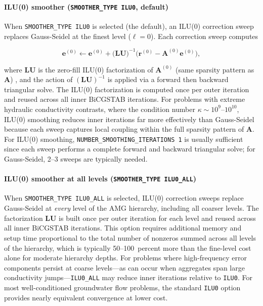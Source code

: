 \paragraph{ILU(0) smoother (\texttt{SMOOTHER\_TYPE ILU0}, default)}
When \texttt{SMOOTHER\_TYPE ILU0} is selected (the default), an ILU(0) correction sweep replaces Gauss-Seidel at the finest level ($\ell = 0$). Each correction sweep computes

\begin{equation}
  \label{eqn:ilu0smooth}
  \mathbf{e}^{(0)} \leftarrow \mathbf{e}^{(0)} + \bigl(\mathbf{L}\mathbf{U}\bigr)^{-1}
    \bigl(\mathbf{r}^{(0)} - \mathbf{A}^{(0)}\mathbf{e}^{(0)}\bigr) ,
\end{equation}

\noindent where $\mathbf{L}\mathbf{U}$ is the zero-fill ILU(0) factorization of $\mathbf{A}^{(0)}$ (same sparsity pattern as $\mathbf{A}$) \citep{saad2003iterative,trottenberg2001}, and the action of $(\mathbf{L}\mathbf{U})^{-1}$ is applied via a forward then backward triangular solve. The ILU(0) factorization is computed once per outer iteration and reused across all inner BiCGSTAB iterations. For problems with extreme hydraulic conductivity contrasts, where the condition number $\kappa \sim 10^9$--$10^{10}$, ILU(0) smoothing reduces inner iterations far more effectively than Gauss-Seidel because each sweep captures local coupling within the full sparsity pattern of $\mathbf{A}$. For ILU(0) smoothing, \texttt{NUMBER\_SMOOTHING\_ITERATIONS 1} is usually sufficient since each sweep performs a complete forward and backward triangular solve; for Gauss-Seidel, 2--3 sweeps are typically needed.

\paragraph{ILU(0) smoother at all levels (\texttt{SMOOTHER\_TYPE ILU0\_ALL})}
When \texttt{SMOOTHER\_TYPE ILU0\_ALL} is selected, ILU(0) correction sweeps replace Gauss-Seidel at \emph{every} level of the AMG hierarchy, including all coarser levels. The factorization $\mathbf{L}\mathbf{U}$ is built once per outer iteration for each level and reused across all inner BiCGSTAB iterations. This option requires additional memory and setup time proportional to the total number of nonzeros summed across all levels of the hierarchy, which is typically 50--100~percent more than the fine-level cost alone for moderate hierarchy depths. For problems where high-frequency error components persist at coarse levels---as can occur when aggregates span large conductivity jumps---\texttt{ILU0\_ALL} may reduce inner iterations relative to \texttt{ILU0}. For most well-conditioned groundwater flow problems, the standard \texttt{ILU0} option provides nearly equivalent convergence at lower cost.

